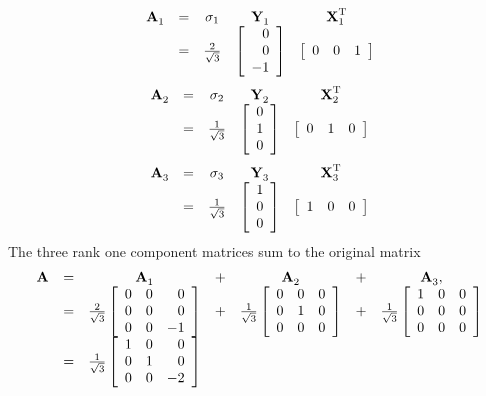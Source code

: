 \begin{equation}
  \begin{array}{ccccccccccccc}
    \A{}_{1} &=& \sigma_{1} & \Y{}_{1} & \X{T}_{1} \\
    &=& \frac{2}{\sqrt{3}} & \mat{r}{0\\0\\-1}&\mat{rrr}{0&0&1}
  \end{array}
\end{equation}
\begin{equation}
  \begin{array}{ccccccccccccc}
    \A{}_{2} &=& \sigma_{2} & \Y{}_{2} & \X{T}_{2} \\
    &=& \sthree& \mat{r}{0\\1\\0}&\mat{rrr}{0&1&0}
  \end{array}
\end{equation}
\begin{equation}
  \begin{array}{ccccccccccccc}
    \A{}_{3} &=& \sigma_{3} & \Y{}_{3} & \X{T}_{3} \\
    &=& \sthree & \mat{r}{1\\0\\0}&\mat{rrr}{1&0&0}
  \end{array}
\end{equation}
The three rank one component matrices sum to the original matrix
\begin{equation}
  \begin{array}{ccccccc}
    \A{} &=& \A{}_{1} &+& \A{}_{2} &+& \A{}_{3},\\
         &=& \frac{2}{\sqrt{3}}  \mat{rrr}{0&0&0 \\ 0&0&0 \\ 0&0&-1} &+& \frac{1}{\sqrt{3}}  \mat{rrr}{0&0&0 \\ 0&1&0 \\ 0&0&0} &+& \frac{1}{\sqrt{3}}  \mat{rrr}{1&0&0 \\ 0&0&0 \\ 0&0&0}\\
    &=&\frac{1}{\sqrt{3}} \mat{rrr}{1&0&0 \\ 0&1&0 \\ 0&0&-2}
  \end{array}
\end{equation}



\endinput